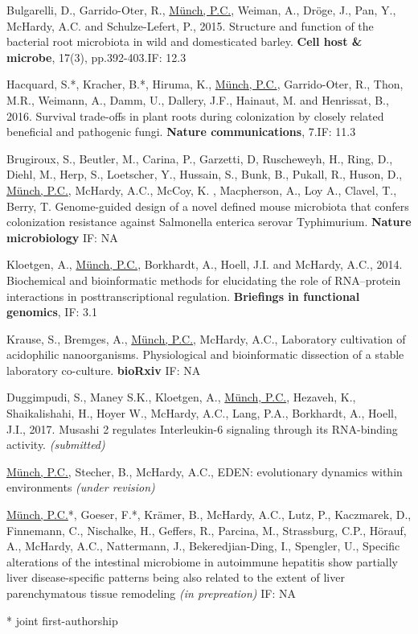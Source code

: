 \documentclass[margin, 10pt]{res}
\begin{document}
\begin{resume}
Bulgarelli, D., Garrido-Oter, R., \underline{M\"unch, P.C.}, Weiman, A., Dr\"oge, J., Pan, Y., McHardy, A.C. and Schulze-Lefert, P., 2015. Structure and function of the bacterial root microbiota in wild and domesticated barley. \textbf{Cell host \& microbe}, 17(3), pp.392-403.\hfill IF: 12.3

Hacquard, S.*, Kracher, B.*, Hiruma, K., \underline{M\"unch, P.C.}, Garrido-Oter, R., Thon, M.R., Weimann, A., Damm, U., Dallery, J.F., Hainaut, M. and Henrissat, B., 2016. Survival trade-offs in plant roots during colonization by closely related beneficial and pathogenic fungi. \textbf{Nature communications}, 7.\hfill IF: 11.3

Brugiroux, S., Beutler, M., Carina, P., Garzetti, D, Ruscheweyh, H., Ring, D., Diehl, M., Herp, S., Loetscher, Y., Hussain, S., Bunk, B., Pukall, R., Huson, D., \underline{M\"unch, P.C.}, McHardy, A.C., McCoy, K. , Macpherson, A., Loy A., Clavel, T., Berry, T. Genome-guided design of a novel defined mouse microbiota that confers colonization resistance against Salmonella enterica serovar Typhimurium. \textbf{Nature microbiology} \hfill IF: NA

Kloetgen, A., \underline{M\"unch, P.C.}, Borkhardt, A., Hoell, J.I. and McHardy, A.C., 2014. Biochemical and bioinformatic methods for elucidating the role of RNA–protein interactions in posttranscriptional regulation. \textbf{Briefings in functional genomics}, \hfill IF: 3.1

Krause, S., Bremges, A., \underline{M\"unch, P.C.}, McHardy, A.C., Laboratory cultivation of acidophilic nanoorganisms. Physiological and bioinformatic dissection of a stable laboratory co-culture. \textbf{bioRxiv} \hfill IF: NA

Duggimpudi, S., Maney S.K., Kloetgen, A., \underline{M\"unch, P.C.}, Hezaveh, K., Shaikalishahi, H., Hoyer W., McHardy, A.C., Lang, P.A., Borkhardt, A., Hoell, J.I., 2017. Musashi 2 regulates Interleukin-6 signaling through its RNA-binding activity. \textit{(submitted)}

\underline{M\"unch, P.C.}, Stecher, B., McHardy, A.C., EDEN: evolutionary dynamics within environments \textit{(under revision)}

\underline{M\"unch, P.C.}*, Goeser, F.*, Krämer, B., McHardy, A.C., Lutz, P., Kaczmarek, D.,  Finnemann, C., Nischalke, H., Geffers, R., Parcina, M.,  Strassburg,  C.P., Hörauf, A., McHardy, A.C.,  Nattermann, J., Bekeredjian-Ding, I., Spengler, U., Specific alterations of the intestinal microbiome in autoimmune hepatitis show partially liver disease-specific patterns being also related to the extent of liver parenchymatous tissue remodeling \textit{(in prepreation)} \hfill IF: NA

* joint first-authorship

\end{resume}
\end{document}
